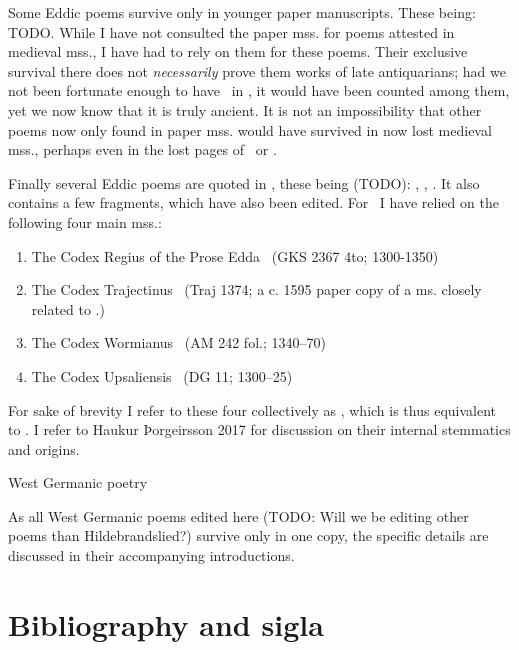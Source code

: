     Some Eddic poems survive only in younger paper manuscripts. These being: TODO. While I have not consulted the paper mss. for poems attested in medieval mss., I have had to rely on them for these poems. Their exclusive survival there does not \emph{necessarily} prove them works of late antiquarians; had we not been fortunate enough to have \Baldrsdraumar\ in \AM, it would have been counted among them, yet we now know that it is truly ancient. It is not an impossibility that other poems now only found in paper mss. would have survived in now lost medieval mss., perhaps even in the lost pages of \Regius\ or \AM.

    Finally several Eddic poems are quoted in \Gylfaginning, these being (TODO): \Voluspa, \Vafthrudnismal, \Grimnismal. It also contains a few fragments, which have also been edited. For \Gylfaginning\ I have relied on the following four main mss.:\begin{enumerate}
	   \item The Codex Regius of the Prose Edda \RegiusProse\ (GKS 2367 4to; 1300-1350)
     \item The Codex Trajectinus \Trajectinus\ (Traj 1374; a c. 1595 paper copy of a ms. closely related to \RegiusProse.)
     \item The Codex Wormianus \Wormianus\ (AM 242 fol.; 1340–70)
     \item The Codex Upsaliensis \Upsaliensis\ (DG 11; 1300–25)\end{enumerate}

     For sake of brevity I refer to these four collectively as \GylfMS, which is thus equivalent to \RegiusProse\Trajectinus\Wormianus\Upsaliensis. I refer to Haukur Þorgeirsson 2017 for discussion on their internal stemmatics and origins.

     West Germanic poetry

     As all West Germanic poems edited here (TODO: Will we be editing other poems than Hildebrandslied?) survive only in one copy, the specific details are discussed in their accompanying introductions.

\chapter{Bibliography and sigla}

